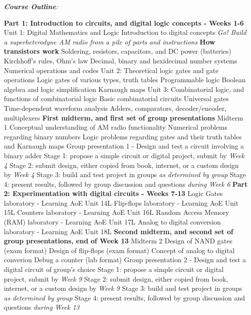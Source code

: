 \documentclass[10pt]{article}
\begin{document}
\clearpage
\textit{\textbf{Course Outline}:}
\begin{outline}[enumerate]
\1 \textbf{Part 1: Introduction to circuits, and digital logic concepts - Weeks 1-6}
\2 Unit 1: Digital Mathematics and Logic
\3 Introduction to digital concepts
\3 \textit{Go!  Build a superheterodyne AM radio from a pile of parts and instructions}
\4 \textbf{How transistors work}
\4 Soldering, resistors, capacitors, and DC power (batteries)
\4 Kirchhoff's rules, Ohm's law
\3 Decimal, binary and hexidecimal number systems
\3 Numerical operations and codes
\2 Unit 2: Theoretical logic gates and gate operations
\3 Logic gates of various types, truth tables
\3 Programmable logic
\3 Boolean algebra and logic simplification
\3 Karnaugh maps
\2 Unit 3: Combinatorial logic, and functions of combinatorial logic 
\3 Basic combinatorial circuits
\3 Universal gates
\3 Time-dependent waveform analysis
\3 Adders, comparators, decoder/encoder, multiplexers
\1 \textbf{First midterm, and first set of group presentations}
\2 Midterm 1
\3 Conceptual understanding of AM radio functionality
\3 Numerical problems regarding binary numbers
\3 Logic problems regarding gates and their truth tables and Karnaugh maps
\2 Group presentation 1 - Design and test a circuit involving a binary adder
\3 Stage 1: propose a simple circuit or digital project, submit by \textit{Week 4}
\3 Stage 2: submit design, either copied from book, internet, or a custom design by \textit{Week 4}
\3 Stage 3: build and test project in groups \textit{as determined by group}
\3 Stage 4: present results, followed by group discussion and questions \textit{during Week 6}
\1 \textbf{Part 2: Experimentation with digital circuits - Weeks 7-13}
\2 Logic Gates laboratory - Learning AoE Unit 14L
\2 Flip-flops laboratory - Learning AoE Unit 15L
\2 Counters laboratory - Learning AoE Unit 16L
\2 Random Access Memory (RAM) laboratory - Learning AoE Unit 17L
\2 Analog to digital conversion laboratory - Learning AoE Unit 18L
\1 \textbf{Second midterm, and second set of group presentations, end of Week 13}
\2 Midterm 2
\3 Design of NAND gates (exam format)
\3 Design of flip-flops (exam format)
\3 Concept of analog to digital converion
\3 Debug a counter (lab format)
\2 Group presentation 2 - Design and test a digital circuit of group's choice
\3 Stage 1: propose a simple circuit or digital project, submit by \textit{Week 9}
\3 Stage 2: submit design, either copied from book, internet, or a custom design by \textit{Week 9}
\3 Stage 3: build and test project in groups \textit{as determined by group}
\3 Stage 4: present results, followed by group discussion and questions \textit{during Week 13}
\end{outline}
\end{document}
